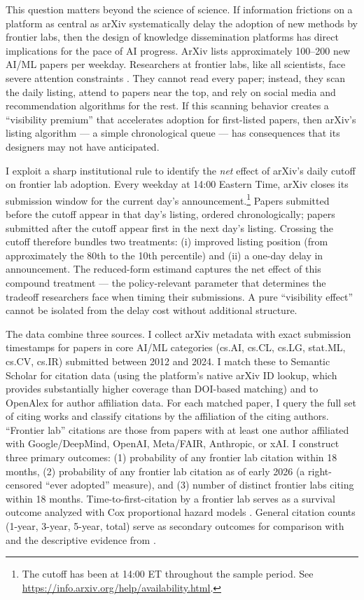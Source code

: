\documentclass[12pt]{article}
\begin{document}
This question matters beyond the science of science. If information frictions on a platform as central as arXiv systematically delay the adoption of new methods by frontier labs, then the design of knowledge dissemination platforms has direct implications for the pace of AI progress. ArXiv lists approximately 100--200 new AI/ML papers per weekday. Researchers at frontier labs, like all scientists, face severe attention constraints \citep{jones2009, bloom2020}. They cannot read every paper; instead, they scan the daily listing, attend to papers near the top, and rely on social media and recommendation algorithms for the rest. If this scanning behavior creates a ``visibility premium'' that accelerates adoption for first-listed papers, then arXiv's listing algorithm --- a simple chronological queue --- has consequences that its designers may not have anticipated.

I exploit a sharp institutional rule to identify the \textit{net} effect of arXiv's daily cutoff on frontier lab adoption. Every weekday at 14:00 Eastern Time, arXiv closes its submission window for the current day's announcement.\footnote{The cutoff has been at 14:00 ET throughout the sample period. See \url{https://info.arxiv.org/help/availability.html}.} Papers submitted before the cutoff appear in that day's listing, ordered chronologically; papers submitted after the cutoff appear first in the next day's listing. Crossing the cutoff therefore bundles two treatments: (i) improved listing position (from approximately the 80th to the 10th percentile) and (ii) a one-day delay in announcement. The reduced-form estimand captures the net effect of this compound treatment --- the policy-relevant parameter that determines the tradeoff researchers face when timing their submissions. A pure ``visibility effect'' cannot be isolated from the delay cost without additional structure.

The data combine three sources. I collect arXiv metadata with exact submission timestamps for papers in core AI/ML categories (cs.AI, cs.CL, cs.LG, stat.ML, cs.CV, cs.IR) submitted between 2012 and 2024. I match these to Semantic Scholar \citep{priem2022} for citation data (using the platform's native arXiv ID lookup, which provides substantially higher coverage than DOI-based matching) and to OpenAlex for author affiliation data. For each matched paper, I query the full set of citing works and classify citations by the affiliation of the citing authors. ``Frontier lab'' citations are those from papers with at least one author affiliated with Google/DeepMind, OpenAI, Meta/FAIR, Anthropic, or xAI. I construct three primary outcomes: (1) probability of any frontier lab citation within 18 months, (2) probability of any frontier lab citation as of early 2026 (a right-censored ``ever adopted'' measure), and (3) number of distinct frontier labs citing within 18 months. Time-to-first-citation by a frontier lab serves as a survival outcome analyzed with Cox proportional hazard models \citep{cox1972}. General citation counts (1-year, 3-year, 5-year, total) serve as secondary outcomes for comparison with \citet{feenberg2017} and the descriptive evidence from \citet{haque2009, haque2010}.
\end{document}
